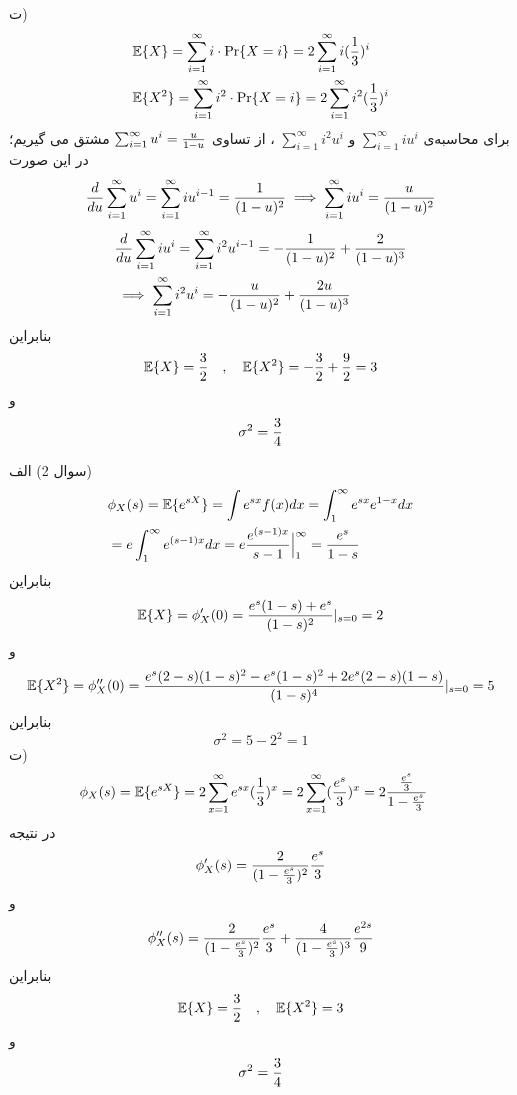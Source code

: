 \documentclass[10pt,letterpaper]{report}
\begin{document}
ت) 
\begin{equation}
\begin{split}
&
\mathbb{E}\{X\}=\sum_{i=1}^\infty i\cdot\Pr\{X=i\}=2\sum_{i=1}^\infty i({1\over 3})^i
\\&
\mathbb{E}\{X^2\}=\sum_{i=1}^\infty i^2\cdot\Pr\{X=i\}=2\sum_{i=1}^\infty i^2({1\over 3})^i
\end{split}
\end{equation}
برای محاسبه‌ی 
$
\sum_{i=1}^\infty iu^i
$
و
$
\sum_{i=1}^\infty i^2u^i
$
، از تساوی
$
\sum_{i=1}^\infty u^i={u\over 1-u}
$
مشتق می گیریم؛ در این صورت
\begin{equation}
\begin{split}
{d\over du}\sum_{i=1}^\infty u^i=\sum_{i=1}^\infty iu^{i-1}={1\over (1-u)^2}\implies \sum_{i=1}^\infty iu^{i}={u\over (1-u)^2}
\end{split}
\end{equation}
\begin{equation}
\begin{split}
&{d\over du}\sum_{i=1}^\infty iu^i=\sum_{i=1}^\infty i^2u^{i-1}=-{1\over (1-u)^2}+{2\over (1-u)^3}
\\&
\implies \sum_{i=1}^\infty i^2u^{i}=-{u\over (1-u)^2}+{2u\over (1-u)^3}
\end{split}
\end{equation}
بنابراین 
$$
\mathbb{E}\{X\}={3\over 2}\quad,\quad \mathbb{E}\{X^2\}=-{3\over 2}+{9\over 2}=3
$$
و
$$
\sigma^2={3\over 4}
$$

سوال 2) الف)
\begin{equation}
\begin{split}
&\phi_X(s)=\mathbb{E}\{e^{sX}\}=\int e^{sx}f(x)dx=\int_1^\infty e^{sx}e^{1-x}dx
\\&=
e\int_1^\infty e^{(s-1)x}dx
=e{e^{(s-1)x}\over s-1}\Big|_1^\infty={e^s\over 1-s}
\end{split}
\end{equation}
بنابراین
$$
\mathbb{E}\{X\}=\phi_X'(0)={e^s(1-s)+e^s\over (1-s)^2}|_{s=0}=2
$$
و
$$
\mathbb{E}\{X^2\}=\phi_X''(0)={e^s(2-s)(1-s)^2-e^s(1-s)^2+2e^s(2-s)(1-s)\over (1-s)^4}|_{s=0}=5
$$
بنابراین
$$
\sigma^2=5-2^2=1
$$
ت)
\begin{equation}
\begin{split}
&\phi_X(s)=\mathbb{E}\{e^{sX}\}=2\sum_{x=1}^\infty e^{sx}({1\over 3})^x
=2\sum_{x=1}^\infty ({e^s\over 3})^x=2{{e^{s}\over 3}\over 1-{e^{s}\over 3}}
\end{split}
\end{equation}
در نتیجه
$$
\phi'_X(s)={2\over (1-{e^s\over 3})^2}{e^s\over 3}
$$
و
$$
\phi''_X(s)={2\over (1-{e^s\over 3})^2}{e^s\over 3}+{4\over (1-{e^s\over 3})^3}{e^{2s}\over 9}
$$
بنابراین
$$
\mathbb{E}\{X\}={3\over 2}\quad,\quad \mathbb{E}\{X^2\}=3
$$
و
$$
\sigma^2={3\over 4}
$$
\end{document}
